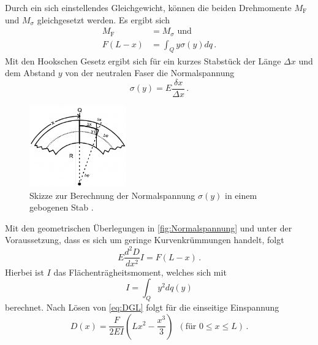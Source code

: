 Durch ein sich einstellendes Gleichgewicht, können die beiden Drehmomente $M_\text{F}$ und $M_\sigma$ gleichgesetzt werden.
Es ergibt sich
\begin{align*}
    M_\text{F} &= M_\sigma \text{ und}\\
    F(L-x) &= \int_{Q} y \sigma(y) dq  \, .
\end{align*}
Mit den Hookschen Gesetz ergibt sich für ein kurzes Stabstück der Länge $\Delta x$ und dem Abstand $y$ 
von der neutralen Faser die Normalspannung
\begin{equation*}
    \sigma (y) = E \frac{\delta x}{\Delta x} \, .
\end{equation*}
\begin{figure}
    \centering
    \includegraphics[height=3.5cm]{Abbildungen/Skizze_Normalspannung.pdf}
    \caption{Skizze zur Berechnung der Normalspannung $\sigma (y)$ in einem gebogenen Stab \cite{V103_Anleitung}.}
    \label{fig:Normalspannung}
\end{figure}
Mit den geometrischen Überlegungen in \autoref{fig:Normalspannung}
und unter der Voraussetzung, dass es sich um geringe Kurvenkrümmungen handelt, folgt
\begin{equation} \label{eq:DGL}
    E \frac{d^2 D}{d x^2} I = F(L-x) \, .
\end{equation}
Hierbei ist $I$ das Flächenträgheitsmoment, welches sich mit
\begin{equation*}
    I = \int_{Q} y^2 dq(y)
\end{equation*}
berechnet.
Nach Lösen von \autoref{eq:DGL} folgt für die einseitige Einspannung
\begin{equation}
    D(x) = \frac{F}{2EI}(Lx^2-\frac{x^3}{3}) \, \, \, (\text{für } 0 \leq x \leq L) \, .
    \label{eq:polynom1}
\end{equation}

